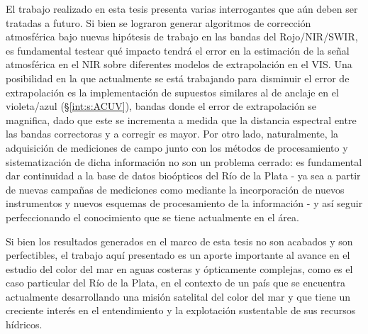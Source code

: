 El trabajo realizado en esta tesis presenta varias interrogantes que aún deben ser tratadas a futuro. Si bien se lograron generar algoritmos de corrección atmosférica bajo nuevas hipótesis de trabajo en las bandas del Rojo/NIR/SWIR, es fundamental testear qué impacto tendrá el error en la estimación de la señal atmosférica en el NIR sobre diferentes modelos de extrapolación en el VIS. Una posibilidad en la que actualmente se está trabajando para disminuir el error de extrapolación es la implementación de supuestos similares al de anclaje en el violeta/azul (\S \ref{int:s:ACUV}), bandas donde el error de extrapolación se magnifica, dado que este se incrementa a medida que la distancia espectral entre las bandas correctoras y a corregir es mayor.
Por otro lado, naturalmente, la adquisición de mediciones de campo junto con los métodos de procesamiento y sistematización de dicha información no son un problema cerrado: es fundamental dar continuidad a la base de datos bioópticos del Río de la Plata - ya sea a partir de nuevas campañas de mediciones como mediante la incorporación de nuevos instrumentos y nuevos esquemas de procesamiento de la información - y así seguir perfeccionando el conocimiento que se tiene actualmente en el área.

Si bien los resultados generados en el marco de esta tesis no son acabados y son perfectibles, el trabajo aquí presentado es un aporte importante al avance en el estudio del color del mar en aguas costeras y ópticamente complejas, como es el caso particular del Río de la Plata, en el contexto de un país que se encuentra actualmente desarrollando una misión satelital del color del mar y que tiene un creciente interés en el entendimiento y la explotación sustentable de sus recursos hídricos.